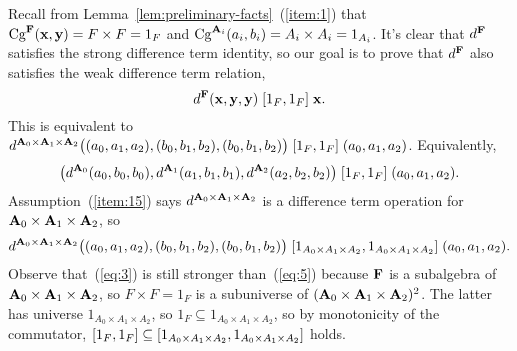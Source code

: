 Recall from Lemma~\ref{lem:preliminary-facts}~(\ref{item:1}) that
$\operatorname{Cg}^{\mathbf{F}}(\mathbf{x}, \mathbf{y}) = F\times F = 1_F$ and
$\operatorname{Cg}^{\mathbf{A}_i}(a_i, b_i) = A_i \times A_i = 1_{A_i}$.
It's clear that $d^{\mathbf{F}}$ satisfies the strong difference term identity, so 
our goal is to prove that $d^{\mathbf{F}}$ also satisfies the weak difference term relation,
\begin{equation}
  \label{eq:3}  
  d^{\mathbf{F}}(\mathbf{x}, \mathbf{y}, \mathbf{y}) \mathrel{[1_F, 1_F]} \mathbf{x}.
\end{equation}
This is equivalent to $d^{\mathbf{A}_0\times \mathbf{A}_1 \times \mathbf{A}_2}\bigl((a_0, a_1, a_2), (b_0, b_1, b_2), (b_0, b_1, b_2)\bigr) \mathrel{[1_{F}, 1_{F}]} (a_0, a_1, a_2)$.
Equivalently, %
\begin{equation*}
\bigl(d^{\mathbf{A}_0}(a_0, b_0, b_0), d^{\mathbf{A}_1}(a_1, b_1, b_1), d^{\mathbf{A}_2}(a_2, b_2, b_2)\bigr)
 \mathrel{[1_F, 1_F]} (a_0, a_1, a_2).
\end{equation*}
Assumption~(\ref{item:15}) says
$d^{\mathbf{A}_0\times \mathbf{A}_1 \times \mathbf{A}_2}$ is a difference term operation for 
$\mathbf{A}_0\times \mathbf{A}_1 \times \mathbf{A}_2$, so
\begin{equation}
    \label{eq:5}
  d^{\mathbf{A}_0\times \mathbf{A}_1 \times \mathbf{A}_2}\bigl((a_0, a_1, a_2), (b_0, b_1, b_2), (b_0, b_1, b_2)\bigr)
  \mathrel{[1_{A_0\times A_1\times A_2}, 1_{A_0\times A_1\times A_2}]} (a_0, a_1, a_2).
\end{equation}
Observe that~(\ref{eq:3}) is still stronger than~(\ref{eq:5})
because $\mathbf{F}$ is a subalgebra of $\mathbf{A}_0\times \mathbf{A}_1 \times \mathbf{A}_2$, so 
$F \times F = 1_F$ is a subuniverse of
$(\mathbf{A}_0 \times \mathbf{A}_1 \times \mathbf{A}_2)^2$.  The latter has universe
$1_{A_0 \times A_1 \times A_2}$, so
$1_F \subseteq 1_{A_0 \times A_1 \times A_2}$, so by monotonicity of the commutator,
$[1_F, 1_F] \subseteq [1_{A_0\times A_1\times A_2}, 1_{A_0\times A_1\times A_2}]$ holds.

